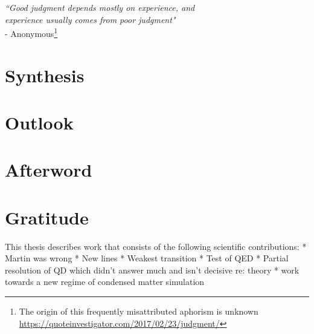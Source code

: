 
\begin{flushright}
\emph{``Good judgment depends mostly on experience, and\\ experience usually comes from poor judgment"} \\- Anonymous\footnote{The origin of this frequently misattributed aphorism is unknown \url{https://quoteinvestigator.com/2017/02/23/judgment/}}
\end{flushright}


\section{Synthesis}\label{sec:synthesis}
\section{Outlook}\label{sec:outlook}
\section{Afterword}\label{sec:afterword}
\section*{Gratitude}\label{sec:gratitude}

This thesis describes work that consists of the following scientific
contributions: * Martin was wrong * New lines * Weakest transition *
Test of QED * Partial resolution of QD which didn't answer much and
isn't decisive re: theory * work towards a new regime of condensed
matter simulation

